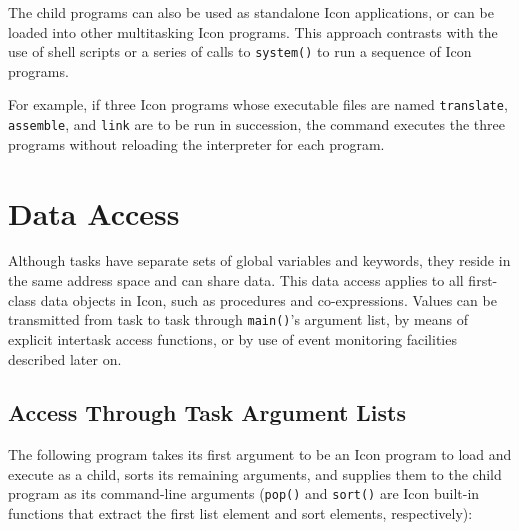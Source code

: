 The child programs can also be used as standalone Icon applications, or can
be loaded into other multitasking Icon programs.  This approach contrasts
with the use of shell scripts or a series of calls to {\tt system()} to run
a sequence of Icon programs.


For example, if three Icon programs whose executable files are named
{\tt translate}, {\tt assemble}, and {\tt link} are to be run in
succession, the command
\noindent executes the three programs without reloading the
interpreter for each program.




\section{Data Access}

Although tasks have separate sets of global variables and keywords,
they reside in the same address space and can share data.
This data access applies to all first-class data objects in Icon, such
as procedures and co-expressions.  Values can be transmitted from
task to task through {\tt main()}'s argument list,
by means of explicit intertask access functions, or by
use of event monitoring facilities described later on.

\subsection{Access Through Task Argument Lists}


The following program takes its first argument to be an Icon program
to load and execute as a child, sorts its remaining arguments, and
supplies them to the child program as its command-line arguments
({\tt pop()} and {\tt sort()} are Icon built-in functions that extract
the first list element and sort elements, respectively):


